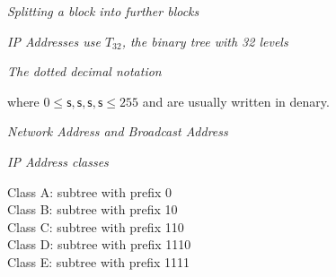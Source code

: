 \textit{Splitting a block into further blocks}


\frmrule 

\textit{IP Addresses use $T_{32}$, the binary tree with 32 levels}

\frmrule 

\textit{The dotted decimal notation}


where $0 \leqslant \textsf{s},\textsf{s},\textsf{s},\textsf{s} \leqslant 255$ and 
are usually written in denary. 

\frmrule 

\textit{Network Address and Broadcast Address}



\frmrule 

\textit{IP Address classes}

Class A: subtree with prefix 0 \\
Class B: subtree with prefix 10 \\
Class C: subtree with prefix 110 \\
Class D: subtree with prefix 1110 \\
Class E: subtree with prefix 1111



